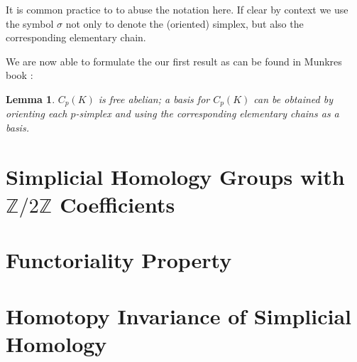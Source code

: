 \documentclass[draft]{scrartcl}
\theoremstyle{plain}
\newtheorem{lemma}[theorem]{Lemma}
\theoremstyle{definition}
\theoremstyle{remark}
\newcommand{\SH}{Simplicial Homology}
\begin{document}
It is common practice to to abuse the notation here. If clear by context we use the symbol $\sigma$ not only to denote the (oriented) simplex, but also the corresponding elementary chain.

We are now able to formulate the our first result as can be found in Munkres book \cite[Lemma 5.1, p. 28]{mu}:
\begin{lemma}
	$C_p(K)$ is free abelian; a basis for $C_p(K)$ can be obtained by orienting each $p$-simplex and using the corresponding elementary chains as a basis.
\end{lemma}
\section{\SH{} Groups with $\mathbb{Z}/2\mathbb{Z}$ Coefficients}
\section{Functoriality Property}
\section{Homotopy Invariance of \SH}

\printbibliography
\end{document}
